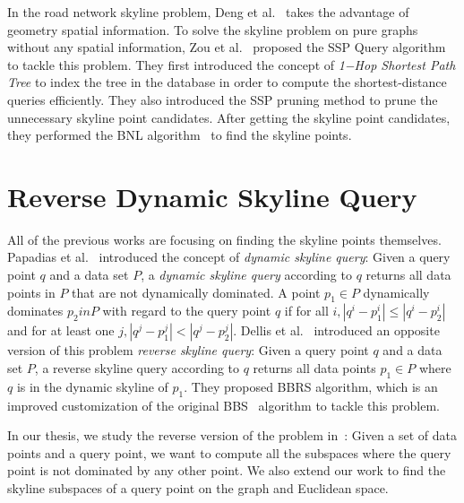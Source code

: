 In the road network skyline problem, Deng et al.~\cite{deng2007multi} takes the advantage of geometry spatial information. To solve the skyline problem on pure graphs without any spatial information, Zou et al.~\cite{zou2010dynamic} proposed the SSP Query algorithm to tackle this problem. They first introduced the concept of \emph{1−Hop Shortest Path Tree} to index the tree in the database in order to compute the shortest-distance queries efficiently. They also introduced the SSP pruning method to prune the unnecessary skyline point candidates. After getting the skyline point candidates, they performed the BNL algorithm~\cite{borzsony2001skyline} to find the skyline points.

\section{Reverse Dynamic Skyline Query}
All of the previous works are focusing on finding the skyline points themselves. Papadias et al.~\cite{papadias2003optimal} introduced the concept of \emph{dynamic skyline query}: Given a query point $q$ and a data set $P$, a \emph{dynamic skyline query} according to $q$ returns all data points in $P$ that are not dynamically dominated. A point $p_1 \in P$ dynamically dominates $p_2 in P$ with regard to the query point $q$ if for all $i, |q^i-p^i_1| \leq |q^i-p^i_2|$ and for at least one $j, |q^j-p^j_1| < |q^j-p^j_2|$. Dellis et al.~\cite{dellis2007efficient} introduced an opposite version of this problem \emph{reverse skyline query}: Given a query point $q$ and a data set $P$, a reverse skyline query according to $q$ returns all data points $p_1 \in P$ where $q$ is in the dynamic skyline of $p_1$. They proposed BBRS algorithm, which is an improved customization of the original BBS~\cite{papadias2003optimal} algorithm to tackle this problem.

In our thesis, we study the reverse version of the problem in~\cite{tao2006subsky}: Given a set of data points and a query point, we want to compute all the subspaces where the query point is not dominated by any other point. We also extend our work to find the skyline subspaces of a query point on the graph and Euclidean space.




